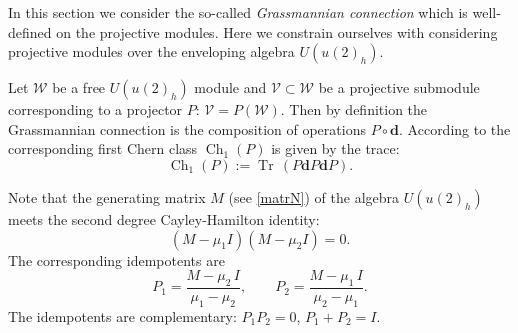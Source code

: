 \documentclass[10pt,a4paper]{amsart}
\DeclareMathOperator{\Tr}{Tr}
\newcommand{\dd}{\mathbf{d}}
\DeclareMathOperator{\Ch}{Ch}
\numberwithin{equation}{section}
\begin{document}
In this section we consider the so-called \emph{Grassmannian connection} which is well-defined on the projective modules. Here
we constrain ourselves with considering projective modules over the enveloping algebra $U(u(2)_h)$.

Let $\mathcal{W}$ be a free $U(u(2)_h)$ module and $\mathcal{V}\subset \mathcal{W}$ be a projective submodule corresponding to
a projector $P$: $\mathcal{V} = P(\mathcal{W})$. Then by definition the Grassmannian connection is the composition
of operations $P\circ \dd$. According to \cite{Gom} the corresponding first Chern class ${\Ch_1(P)}$ is given by the trace:
\[
{\Ch_1(P)} := \Tr\, (P \dd P \dd P).
\]

Note that the generating matrix $M$ (see  \eqref{matrN}) of the algebra $U(u(2)_h)$ meets the second degree Cayley-Hamilton identity:
\[
(M-\mu_1I)(M-\mu_2I) = 0.
\]
The corresponding idempotents are
\[
P_1=\frac{M-\mu_2\, I}{\mu_1-\mu_2},\qquad P_2 =\frac{M-\mu_1\, I}{\mu_2-\mu_1}.
\]
The idempotents are complementary: $P_1P_2=0$, $ P_1+P_2=I$.
\end{document}

